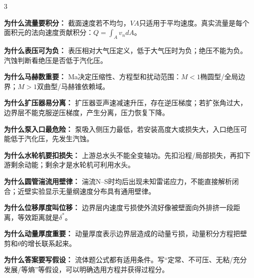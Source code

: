 \documentclass[a4paper]{article}
\newcommand{\sect}[1]{\par{\bfseries\color{Q}#1：}}
\begin{document}
\begin{multicols}{3}
{\sect{为什么流量要积分}
截面速度若不均匀，$VA$只适用于平均速度。真实流量是每个面积元的法向速度贡献积分：$Q=\int_A v_n dA$。
\sect{为什么表压可为负}
表压相对大气压定义，低于大气压时为负；绝压不能为负。汽蚀判断看绝压是否低于汽化压。
\sect{为什么马赫数重要}
Ma决定压缩性、方程型和扰动范围：$M<1$椭圆型/全局边界；$M>1$双曲型/马赫锥依赖域。
\sect{为什么扩压器易分离}
扩压器亚声速减速升压，存在逆压梯度；若扩张角过大，边界层不能克服逆压梯度，产生分离，压力恢复下降。
\sect{为什么泵入口最危险}
泵吸入侧压力最低，若安装高度大或损失大，入口绝压可能低于汽化压，先发生汽蚀。
\sect{为什么水轮机要扣损失}
上游总水头不能全变轴功。先扣沿程/局部损失，再扣下游剩余动能；剩余才是水轮机可利用水头。
\sect{为什么圆管湍流用壁律}
湍流N--S时均后出现未知雷诺应力，不能直接解析闭合；近壁实验显示无量纲速度分布具有通用壁律。
\sect{为什么位移厚度叫位移}
边界层内速度亏损使外流好像被壁面向外排挤一段距离，等效距离就是$\delta^*$。
\sect{为什么动量厚度重要}
动量厚度表示边界层造成的动量亏损，动量积分方程把壁剪和$\theta$的增长联系起来。
\sect{为什么答案要写假设}
流体题公式都有适用条件。写“定常、不可压、无粘/充分发展/等熵”等假设，可以明确选用方程并获得过程分。

}
\end{multicols}
\end{document}
